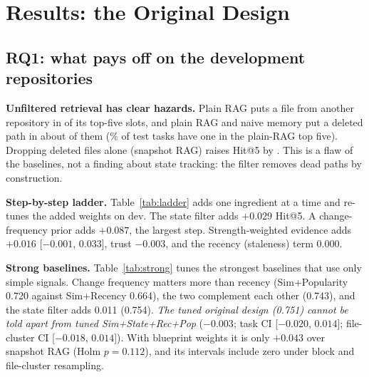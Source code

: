 \documentclass[runningheads]{llncs}
\begin{document}
\section{Results: the Original Design}
\label{sec:orig}
\subsection{RQ1: what pays off on the development repositories}
\textbf{Unfiltered retrieval has clear hazards.} Plain RAG puts a file from another repository in \contamPlain{} of its top-five slots, and plain RAG and naive memory put a deleted path in about \deadPlain{} of them (\plainDeadTasks{}\% of test tasks have one in the plain-RAG top five). Dropping deleted files alone (snapshot RAG) raises Hit@5 by \dSnapPlainFive{}. This is a flaw of the baselines, not a finding about state tracking: the filter removes dead paths by construction.

\textbf{Step-by-step ladder.} Table~\ref{tab:ladder} adds one ingredient at a time and re-tunes the added weights on dev. The state filter adds $+0.029$ Hit@5. A change-frequency prior adds $+0.087$, the largest step. Strength-weighted evidence adds $+0.016$ [$-0.001$, $0.033$], trust $-0.003$, and the recency (staleness) term $0.000$.

\begin{table}[t]\centering\footnotesize\setlength{\tabcolsep}{4pt}
\resizebox{\linewidth}{!}{}
\caption{Step-by-step ladder for the original design on the development test split. Weights of the added terms are tuned on dev at each step.}
\label{tab:ladder}
\end{table}

\textbf{Strong baselines.} Table~\ref{tab:strong} tunes the strongest baselines that use only simple signals. Change frequency matters more than recency (Sim+Popularity 0.720 against Sim+Recency 0.664), the two complement each other (0.743), and the state filter adds 0.011 (0.754). \emph{The tuned original design (0.751) cannot be told apart from tuned Sim+State+Rec+Pop} ($-0.003$; task CI [$-0.020$, $0.014$]; file-cluster CI [$-0.018$, $0.014$]). With blueprint weights it is only $+0.043$ over snapshot RAG (Holm $p=0.112$), and its intervals include zero under block and file-cluster resampling.

\begin{table}[t]\centering\footnotesize\setlength{\tabcolsep}{4pt}
\resizebox{\linewidth}{!}{}
\caption{Tuned baselines on the development test split. Sim: similarity; State: deleted files removed; Rec: recency; Pop: change frequency. Last columns: Hit@5 of the tuned original design minus the row's system.}
\label{tab:strong}
\end{table}
\end{document}
